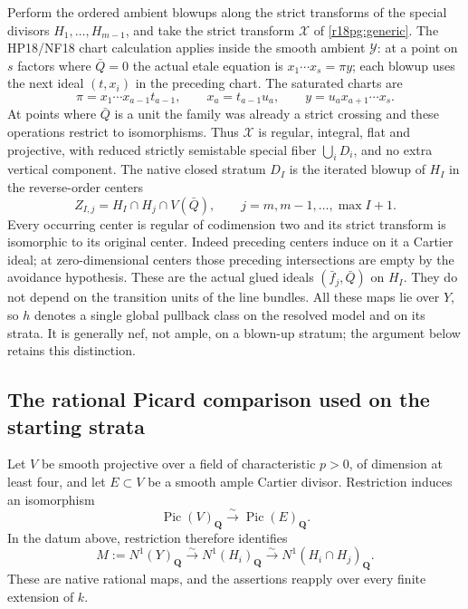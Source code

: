 Perform the ordered ambient blowups along the strict transforms of
the special divisors $H_1,\ldots,H_{m-1}$, and take the strict
transform $\mathcal X$ of \eqref{r18pg:generic}.  The HP18/NF18
chart calculation applies inside the smooth ambient $\mathcal Y$:
at a point on $s$ factors where $\bar Q=0$ the actual etale equation
is $x_1\cdots x_s=\pi y$; each blowup uses the next ideal
$(t,x_i)$ in the preceding chart.  The saturated charts are
\[
 \pi=x_1\cdots x_{a-1}t_{a-1},\qquad
 x_a=t_{a-1}u_a,\qquad
 y=u_a x_{a+1}\cdots x_s.
 \tag{PG18.3}\label{r18pg:charts}
\]
At points where $\bar Q$ is a unit the family was already a strict
crossing and these operations restrict to isomorphisms.  Thus
$\mathcal X$ is regular, integral, flat and projective, with reduced
strictly semistable special fiber $\bigcup_iD_i$, and no extra
vertical component.  The native closed stratum $D_I$ is the iterated
blowup of $H_I$ in the reverse-order centers
\[
 Z_{I,j}=H_I\cap H_j\cap V(\bar Q),\qquad
                j=m,m-1,\ldots,\max I+1.
 \tag{PG18.4}\label{r18pg:centers}
\]
Every occurring center is regular of codimension two and its strict
transform is isomorphic to its original center.  Indeed preceding
centers induce on it a Cartier ideal; at zero-dimensional centers
those preceding intersections are empty by the avoidance hypothesis.
These are the actual glued ideals $(\bar f_j,\bar Q)$ on $H_I$.
They do not depend on the transition units of the line bundles.
All these maps lie over $Y$, so $h$ denotes a single global pullback
class on the resolved model and on its strata.  It is generally nef,
not ample, on a blown-up stratum; the argument below retains this
distinction.

\subsection{The rational Picard comparison used on the starting strata}

\begin{lemma}
\label{r18pg:picard}
Let $V$ be smooth projective over a field of characteristic $p>0$,
of dimension at least four, and let $E\subset V$ be a smooth ample
Cartier divisor.  Restriction induces an isomorphism
\[
                  \operatorname{Pic}(V)_{\mathbf Q}
                    \xrightarrow{\sim}\operatorname{Pic}(E)_{\mathbf Q}.
 \tag{PG18.5}\label{r18pg:picard-Q}
\]
In the datum above, restriction therefore identifies
\[
 M:=N^1(Y)_{\mathbf Q}\xrightarrow{\sim}N^1(H_i)_{\mathbf Q}
                  \xrightarrow{\sim}N^1(H_i\cap H_j)_{\mathbf Q}.
 \tag{PG18.6}\label{r18pg:ambient-NS}
\]
These are native rational maps, and the assertions reapply over
every finite extension of $k$.
\end{lemma}

